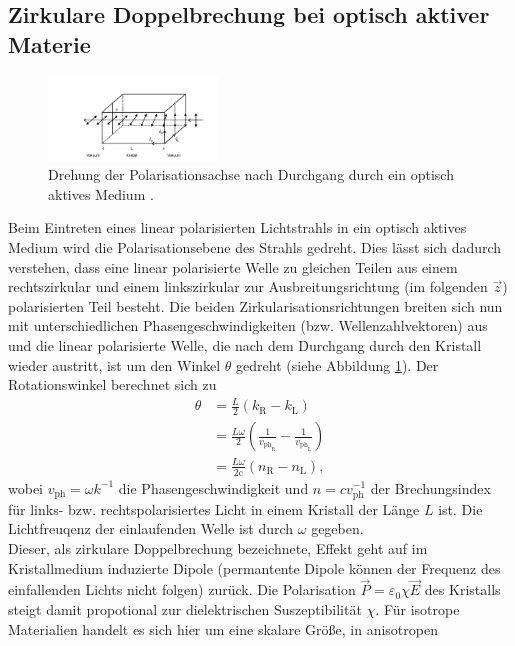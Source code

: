 \subsection{Zirkulare Doppelbrechung bei optisch aktiver Materie}
\begin{figure}[H]
  \center
  \includegraphics[width=0.4\textwidth]{Bilder/Kristall.jpg}
  \caption{Drehung der Polarisationsachse nach Durchgang durch ein optisch
  aktives Medium \cite{Anleitung}.}
  \label{T_Abb:2}
\end{figure}
Beim Eintreten eines linear polarisierten Lichtstrahls in ein optisch aktives Medium
wird die Polarisationsebene des Strahls gedreht. Dies lässt sich dadurch verstehen,
dass eine linear polarisierte Welle zu gleichen Teilen aus einem rechtszirkular und
einem linkszirkular zur Ausbreitungsrichtung (im folgenden $\vec{z}$) polarisierten
Teil besteht. Die beiden Zirkularisationsrichtungen breiten sich nun mit unterschiedlichen
Phasengeschwindigkeiten (bzw. Wellenzahlvektoren) aus und die linear polarisierte
Welle, die nach dem Durchgang durch den Kristall wieder austritt, ist um den Winkel $\theta$
gedreht (siehe Abbildung \ref{T_Abb:2}). Der Rotationswinkel berechnet sich zu
\begin{align*}
    \theta &=\frac{L}{2} \left(k_{\text{R}}-k_{\text{L}}\right)\\
          &=\frac{L\omega}{2}\left(\frac{1}{v_{\text{ph}_{\text{R}}}}-\frac{1}{v_{\text{ph}_{\text{L}}}}\right)\\
          &=\frac{L\omega}{2\text{c}}\left(n_{\text{R}}-n_{\text{L}}\right),
\end{align*}
wobei $v_{\text{ph}}=\omega k^{-1}$ die Phasengeschwindigkeit und $n=c v_{\text{ph}}^{-1}$
der Brechungsindex für links- bzw. rechtspolarisiertes Licht in einem Kristall der
Länge $L$ ist. Die Lichtfreuqenz der einlaufenden Welle ist durch $\omega$ gegeben.\\
Dieser, als zirkulare Doppelbrechung bezeichnete, Effekt geht auf im Kristallmedium induzierte
Dipole (permantente Dipole können der Frequenz des einfallenden Lichts nicht folgen) zurück.
Die Polarisation $\vec{P} = \varepsilon_0 \chi \vec{E}$ des Kristalls
steigt damit propotional zur dielektrischen Suszeptibilität
$\chi$. Für isotrope Materialien handelt es sich hier um eine skalare Größe, in anisotropen
